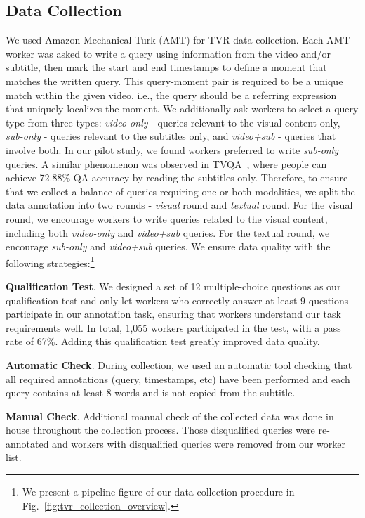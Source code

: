 \documentclass[runningheads]{llncs}
\begin{document}
\subsection{Data Collection}\label{subsec:data_collection}
We used Amazon Mechanical Turk (AMT) for TVR data collection. 
Each AMT worker was asked to write a query using information from the video and/or subtitle, then mark the start and end timestamps to define a moment that matches the written query. 
This query-moment pair is required to be a unique match within the given video, i.e., the query should be a referring expression~\cite{kazemzadeh2014referitgame,anne2017localizing} that uniquely localizes the moment.
We additionally ask workers to select a query type from three types: \textit{video-only} - queries relevant to the visual content only, \textit{sub-only} - queries relevant to the subtitles only, and \textit{video+sub} - queries that involve both. 
In our pilot study, we found workers preferred to write \textit{sub-only} queries. 
A similar phenomenon was observed in TVQA~\cite{Lei2018TVQALC}, where people can achieve 72.88\% QA accuracy by reading the subtitles only. 
Therefore, to ensure that we collect a balance of queries requiring one or both modalities, we split the data annotation into two rounds - \textit{visual} round and \textit{textual} round. 
For the visual round, we encourage workers to write queries related to the visual content, including both \textit{video-only} and \textit{video+sub} queries. 
For the textual round, we encourage \textit{sub-only} and \textit{video+sub} queries. We ensure data quality with the following strategies:\footnote{We present a pipeline figure of our data collection procedure in Fig.~\ref{fig:tvr_collection_overview}.}

\noindent\textbf{Qualification Test}.
We designed a set of 12 multiple-choice questions as our qualification test and only let workers who correctly answer at least 9 questions participate in our annotation task, ensuring that workers understand our task requirements well.
In total, 1,055 workers participated in the test, with a pass rate of 67\%. 
Adding this qualification test greatly improved data quality.

\noindent\textbf{Automatic Check}. 
During collection, we used an automatic tool checking that all required annotations (query, timestamps, etc) have been performed and each query contains at least 8 words and is not copied from the subtitle. 

\noindent\textbf{Manual Check}.
Additional manual check of the collected data was done in house throughout the collection process. 
Those disqualified queries were re-annotated and workers with disqualified queries were removed from our worker list. 
\end{document}
